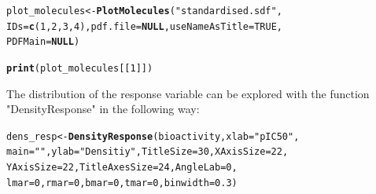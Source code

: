 \documentclass[twoside,a4wide,12pt]{article}\usepackage[]{graphicx}\usepackage[]{color}
\makeatletter
\newcommand{\hlnum}[1]{\textcolor[rgb]{0.686,0.059,0.569}{#1}}%
\newcommand{\hlstr}[1]{\textcolor[rgb]{0.192,0.494,0.8}{#1}}%
\newcommand{\hlstd}[1]{\textcolor[rgb]{0.345,0.345,0.345}{#1}}%
\newcommand{\hlkwa}[1]{\textcolor[rgb]{0.161,0.373,0.58}{\textbf{#1}}}%
\newcommand{\hlkwb}[1]{\textcolor[rgb]{0.69,0.353,0.396}{#1}}%
\newcommand{\hlkwc}[1]{\textcolor[rgb]{0.333,0.667,0.333}{#1}}%
\newcommand{\hlkwd}[1]{\textcolor[rgb]{0.737,0.353,0.396}{\textbf{#1}}}%
\newenvironment{kframe}{%
 \def\at@end@of@kframe{}%
 \ifinner\ifhmode%
  \def\at@end@of@kframe{\end{minipage}}%
  \begin{minipage}{\columnwidth}%
 \fi\fi%
 \def\FrameCommand##1{\hskip\@totalleftmargin \hskip-\fboxsep
 \colorbox{shadecolor}{##1}\hskip-\fboxsep
     \hskip-\linewidth \hskip-\@totalleftmargin \hskip\columnwidth}%
 \MakeFramed {\advance\hsize-\width
   \@totalleftmargin\z@ \linewidth\hsize
   \@setminipage}}%
 {\par\unskip\endMakeFramed%
 \at@end@of@kframe}
\newenvironment{knitrout}{}{} %
\makeatother
\begin{document}
\begin{knitrout}
\color{fgcolor}\begin{kframe}
\begin{alltt}
\hlstd{plot_molecules} \hlkwb{<-} \hlkwd{PlotMolecules}\hlstd{(}\hlstr{"standardised.sdf"}\hlstd{,}
    \hlkwc{IDs} \hlstd{=} \hlkwd{c}\hlstd{(}\hlnum{1}\hlstd{,} \hlnum{2}\hlstd{,} \hlnum{3}\hlstd{,} \hlnum{4}\hlstd{),} \hlkwc{pdf.file} \hlstd{=} \hlkwa{NULL}\hlstd{,} \hlkwc{useNameAsTitle} \hlstd{=} \hlnum{TRUE}\hlstd{,}
    \hlkwc{PDFMain} \hlstd{=} \hlkwa{NULL}\hlstd{)}
\end{alltt}


{\ttfamily\noindent\bfseries{}}\begin{alltt}
\hlkwd{print}\hlstd{(plot_molecules[[}\hlnum{1}\hlstd{]])}
\end{alltt}


{\ttfamily\noindent\bfseries\color{errorcolor}{\#\# Error: object 'plot\_molecules' not found}}\end{kframe}
\end{knitrout}


The distribution of the response variable can be explored with the function "DensityResponse" in the following way: 
\begin{knitrout}
\color{fgcolor}\begin{kframe}
\begin{alltt}
\hlstd{dens_resp} \hlkwb{<-} \hlkwd{DensityResponse}\hlstd{(bioactivity,} \hlkwc{xlab} \hlstd{=} \hlstr{"pIC50"}\hlstd{,}
    \hlkwc{main} \hlstd{=} \hlstr{""}\hlstd{,} \hlkwc{ylab} \hlstd{=} \hlstr{"Densitiy"}\hlstd{,} \hlkwc{TitleSize} \hlstd{=} \hlnum{30}\hlstd{,} \hlkwc{XAxisSize} \hlstd{=} \hlnum{22}\hlstd{,}
    \hlkwc{YAxisSize} \hlstd{=} \hlnum{22}\hlstd{,} \hlkwc{TitleAxesSize} \hlstd{=} \hlnum{24}\hlstd{,} \hlkwc{AngleLab} \hlstd{=} \hlnum{0}\hlstd{,}
    \hlkwc{lmar} \hlstd{=} \hlnum{0}\hlstd{,} \hlkwc{rmar} \hlstd{=} \hlnum{0}\hlstd{,} \hlkwc{bmar} \hlstd{=} \hlnum{0}\hlstd{,} \hlkwc{tmar} \hlstd{=} \hlnum{0}\hlstd{,} \hlkwc{binwidth} \hlstd{=} \hlnum{0.3}\hlstd{)}
\end{alltt}
\end{kframe}
\end{knitrout}
\end{document}
